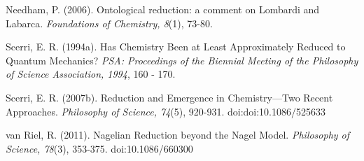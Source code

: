 \documentclass[]{book}
\begin{document}
Needham, P. (2006). Ontological reduction: a comment on Lombardi and
Labarca. \emph{Foundations of Chemistry, 8}(1), 73-80.

Scerri, E. R. (1994a). Has Chemistry Been at Least Approximately Reduced
to Quantum Mechanics? \emph{PSA: Proceedings of the Biennial Meeting of
the Philosophy of Science Association, 1994}, 160 - 170.

Scerri, E. R. (2007b). Reduction and Emergence in Chemistry---Two Recent
Approaches. \emph{Philosophy of Science, 74}(5), 920-931.
doi:doi:10.1086/525633

van Riel, R. (2011). Nagelian Reduction beyond the Nagel Model.
\emph{Philosophy of Science, 78}(3), 353-375. doi:10.1086/660300
\end{document}
